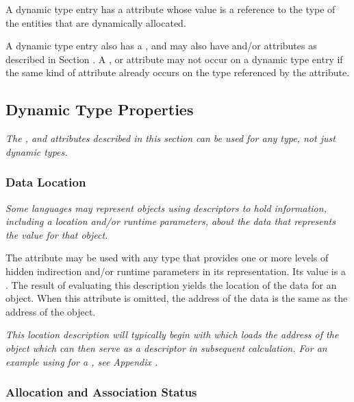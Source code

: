 A dynamic type entry has a \DWATtype{} attribute whose value is a
reference to the type of the entities that are dynamically allocated.
	
A dynamic type entry also has a \DWATdatalocation, and may also
have \DWATallocated{} and/or \DWATassociated{} attributes as 
described in Section . 
A \DWATdatalocation, \DWATallocated{} or \DWATassociated{} attribute 
may not occur on a dynamic type entry if the same kind of attribute 
already occurs on the type referenced by the \DWATtype{} attribute.

\subsection{Dynamic Type Properties}
\label{chap:dynamictypeproperties}
\textit{
The \DWATdatalocation, \DWATallocated{} and \DWATassociated{} 
attributes described in this section can be used for any type, not
just dynamic types.}

\subsubsection{Data Location}
\label{chap:datalocation}

\textit{Some languages may represent objects using descriptors to hold
information, including a location and/or run\dash time parameters,
about the data that represents the value for that object.}

\hypertarget{chap:DWATdatalocationindirectiontoactualdata}{}
The \DWATdatalocation{} 
attribute may be used with any
type that provides one or more levels of 
hidden indirection
and/or run\dash time parameters in its representation. Its value
is a . 
The result of evaluating this
description yields the location of the data for an object.
When this attribute is omitted, the address of the data is
the same as the address of the object.

\textit{This location description will typically begin with
\DWOPpushobjectaddress{} 
which loads the address of the
object which can then serve as a descriptor in subsequent
calculation. For an example using 
\DWATdatalocation{} 
for a , see 
Appendix .}

\subsubsection{Allocation and Association Status}
\label{chap:allocationandassociationstatus}

